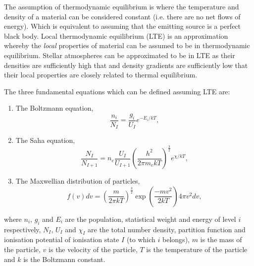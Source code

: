 The assumption of thermodynamic equilibrium is where the temperature and density of a material can be considered constant (i.e. there are no net flows of energy).
Which is equivalent to assuming that the emitting source is a perfect black body.
Local thermodynamic equilibrium (LTE) is an approximation whereby the {\it local} properties of material can be assumed to be in thermodynamic equilibrium.
Stellar atmospheres can be approximated to be in LTE as their densities are sufficiently high that and density gradients are sufficiently low that their local properties are closely related to thermal equilibrium.

The three fundamental equations which can be defined assuming LTE are:

\begin{enumerate}
    \item The Boltzmann equation,
    \begin{equation}
        \frac{n_i}{N_I} = \frac{g_i}{U_I}e^{-E_i/kT},
    \end{equation}
    \item The Saha equation,
    \begin{equation}
        \frac{N_I}{N_{I+1}} = n_e\frac{U_I}{U_{I+1}}\left(\frac{h^2}{2\pi m_ekT}\right)^\frac{3}{2} e^{\chi/kT},
    \end{equation}
    \item The Maxwellian distribution of particles,
    \begin{equation}
        f(v)dv = \left(\frac{m}{2\pi kT}\right)^\frac{3}{2} \exp\left(\frac{-mv^2}{2kT}\right)4\pi v^2dv,
    \end{equation}
\end{enumerate}

\noindent where $n_i$, $g_i$ and $E_i$ are the population, statistical weight and energy of level $i$ respectively,
$N_I$, $U_I$ and $\chi_I$ are the total number density, partition function and ionisation potential of ionisation state $I$ (to which $i$ belongs),
$m$ is the mass of the particle, $v$ is the velocity of the particle, $T$ is the temperature of the particle and $k$ is the Boltzmann constant.





